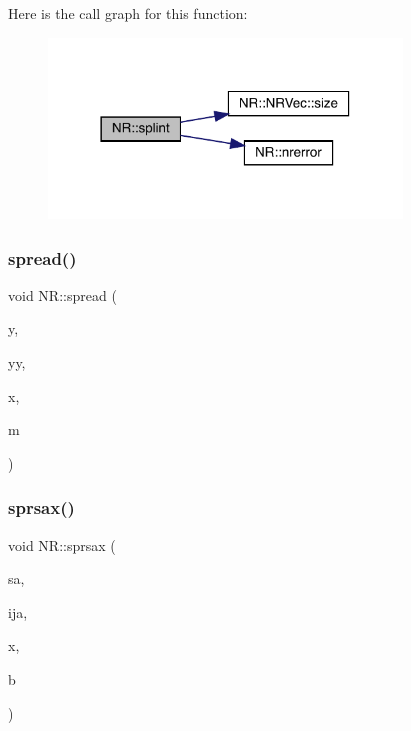 Here is the call graph for this function\+:
\nopagebreak
\begin{figure}[H]
\begin{center}
\leavevmode
\includegraphics[width=266pt]{da/d46/namespaceNR_af17868718dea0cf57360a9a84b1bf76f_cgraph}
\end{center}
\end{figure}
\mbox{\label{namespaceNR_add2c8f2338d667862d2851438e2bbcd9}} 
\subsubsection{\texorpdfstring{spread()}{spread()}}
{\footnotesize\ttfamily void N\+R\+::spread (\begin{DoxyParamCaption}\item[{const \mbox{\hyperlink{namespaceNR_af6ff762dd605ff477b8e52387253a02a}{DP}}}]{y,  }\item[{\mbox{\hyperlink{namespaceNR_ab293e06a6bf799d8a7ed932b6852bcb8}{Vec\+\_\+\+I\+O\+\_\+\+DP}} \&}]{yy,  }\item[{const \mbox{\hyperlink{namespaceNR_af6ff762dd605ff477b8e52387253a02a}{DP}}}]{x,  }\item[{const int}]{m }\end{DoxyParamCaption})}

\mbox{\label{namespaceNR_a569952912ee7ce4678374a5ab9720728}} 
\subsubsection{\texorpdfstring{sprsax()}{sprsax()}}
{\footnotesize\ttfamily void N\+R\+::sprsax (\begin{DoxyParamCaption}\item[{\mbox{\hyperlink{namespaceNR_a9f943da53862537c552e2a770cb170ae}{Vec\+\_\+\+I\+\_\+\+DP}} \&}]{sa,  }\item[{\mbox{\hyperlink{namespaceNR_ae67ce7dc86a8a64a7ce73c3c030ff610}{Vec\+\_\+\+I\+\_\+\+I\+NT}} \&}]{ija,  }\item[{\mbox{\hyperlink{namespaceNR_a9f943da53862537c552e2a770cb170ae}{Vec\+\_\+\+I\+\_\+\+DP}} \&}]{x,  }\item[{\mbox{\hyperlink{namespaceNR_a970094d23441f8ef6a45282a7eb2103d}{Vec\+\_\+\+O\+\_\+\+DP}} \&}]{b }\end{DoxyParamCaption})}

